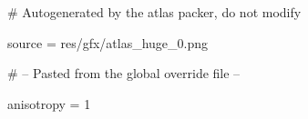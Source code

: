 # Autogenerated by the atlas packer, do not modify

source = res/gfx/atlas_huge_0.png

# -- Pasted from the global override file --

anisotropy = 1
